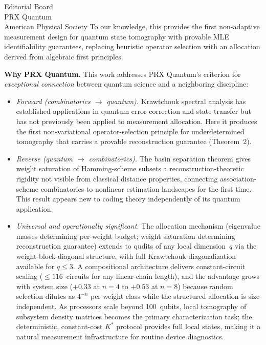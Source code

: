 \documentclass[12pt]{letter}
\newcommand{\paragraph}[1]{\medskip\noindent\textbf{#1}\enspace}
\begin{document}
\begin{letter}{Editorial Board\\
PRX Quantum\\
American Physical Society}
To our knowledge, this provides the first non-adaptive measurement
design for quantum state tomography with provable MLE
identifiability guarantees, replacing heuristic operator
selection with an allocation derived from algebraic first
principles.

\paragraph{Why PRX Quantum.}
This work addresses PRX Quantum's criterion for
\emph{exceptional connection} between quantum science and a
neighboring discipline:

\begin{itemize}
\item \emph{Forward (combinatorics $\to$ quantum).}
  Krawtchouk spectral analysis has established applications in
  quantum error correction and state transfer but has not
  previously been applied to measurement allocation.
  Here it produces the first non-variational operator-selection
  principle for underdetermined tomography that carries a provable
  reconstruction guarantee (Theorem~2).

\item \emph{Reverse (quantum $\to$ combinatorics).}
  The basin separation theorem gives weight saturation of
  Hamming-scheme subsets a reconstruction-theoretic rigidity not
  visible from classical distance properties, connecting
  association-scheme combinatorics to nonlinear estimation
  landscapes for the first time.
  This result appears new to coding theory independently of
  its quantum application.

\item \emph{Universal and operationally significant.}
  The allocation mechanism (eigenvalue masses determining
  per-weight budget; weight saturation determining reconstruction
  guarantee) extends to qudits of any local dimension~$q$ via the
  weight-block-diagonal structure, with full Krawtchouk
  diagonalization available for $q \le 3$.
  A compositional architecture delivers constant-circuit scaling
  ($\le 116$~circuits for any linear-chain length), and the
  advantage grows with system size ($+0.33$ at $n = 4$ to $+0.53$
  at $n = 8$) because random selection dilutes as $4^{-n}$ per
  weight class while the structured allocation is size-independent.
  As processors scale beyond 100~qubits, local tomography of
  subsystem density matrices becomes the primary characterization
  task; the deterministic, constant-cost $K^*$ protocol provides
  full local states, making it a natural measurement infrastructure
  for routine device diagnostics.


\end{itemize}
\end{letter}
\end{document}
